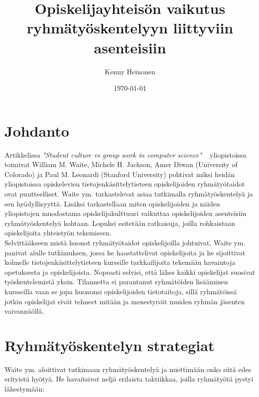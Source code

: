 \documentclass[finnish]{article}
\title{Opiskelijayhteisön vaikutus ryhmätyöskentelyyn liittyviin asenteisiin}
\author{Kenny Heinonen}
\date{\today}
\begin{document}

\maketitle        %
\newpage

\tableofcontents  %
\newpage          %



\section{Johdanto}



Artikkelissa \emph{"Student culture vs group work in computer science"} ~\cite{Waite:2004:SCV:1028174.971308} yliopistoissa toimivat William M. Waite, Michele H. Jackson, Amer Diwan (University of Colorado) ja Paul M. Leonardi (Stanford University) pohtivat miksi heidän yliopistoissa opiskelevien tietojenkäsittelytieteen opiskelijoiden ryhmätyötaidot ovat puutteelliset. Waite ym. tarkastelevat asiaa tutkimalla ryhmätyöskentelyä ja sen hyödyllisyyttä. Lisäksi tarkastellaan miten opiskelijoiden ja näiden yliopistojen muodostama opiskelijakulttuuri vaikuttaa opiskelijoiden asenteisiin ryhmätyöskentelyä kohtaan. Lopuksi esitetään ratkaisuja, joilla rohkaistaan opiskelijoita yhteistyön tekemiseen.\\

Selvittääkseen mistä huonot ryhmätyötaidot opiskelijoilla johtuivat, Waite ym. panivat alulle tutkimuksen, jossa he haastattelivat opiskelijoita ja he sijoittivat kolmelle tietojenkäsittelytieteen kurssille tarkkailijoita tekemään havaintoja opetuksesta ja opiskelijoista. Nopeasti selvisi, että lähes kaikki opiskelijat suosivat työskentelemistä yksin. Tilannetta ei parantanut ryhmätöiden lisääminen kursseilla vaan se jopa huononsi opiskelijoiden tietotaitoja, sillä ryhmätöissä jotkin opiskelijat eivät tehneet mitään ja menestyivät muiden ryhmän jäsenten vaivannäöllä.

\section{Ryhmätyöskentelyn strategiat}

Waite ym. aloittivat tutkimaan ryhmätyöskentelyä ja miettimään onko siitä edes erityistä hyötyä. He havaitsivat neljä erilaista taktiikkaa, joilla ryhmätyötä pystyi lähestymään:
\end{document}
